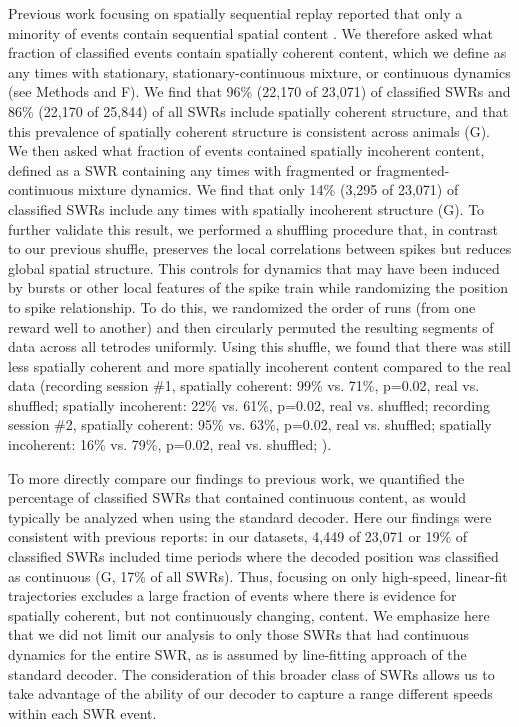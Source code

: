 \documentclass[9pt,lineno]{elife}
\begin{document}
Previous work focusing on spatially sequential replay reported that only a minority of events contain sequential spatial content \citep{KarlssonAwakereplayremote2009, FosterReversereplaybehavioural2006, DavidsonHippocampalReplayExtended2009}. We therefore asked what fraction of classified events contain spatially coherent content, which we define as any times with stationary, stationary-continuous mixture, or continuous dynamics (see Methods and F). We find that 96\% (22,170 of 23,071) of classified SWRs and 86\% (22,170 of 25,844) of all SWRs include spatially coherent structure, and that this prevalence of spatially coherent structure is consistent across animals (G). We then asked what fraction of events contained spatially incoherent content, defined as a SWR containing any times with fragmented or fragmented-continuous mixture dynamics. We find that only 14\% (3,295 of 23,071) of classified SWRs include any times with spatially incoherent structure (G). To further validate this result, we performed a shuffling procedure that, in contrast to our previous shuffle, preserves the local correlations between spikes but reduces global spatial structure. This controls for dynamics that may have been induced by bursts or other local features of the spike train while randomizing the position to spike relationship. To do this, we randomized the order of runs (from one reward well to another) and then circularly permuted the resulting segments of data across all tetrodes uniformly. Using this shuffle, we found that there was still less spatially coherent and more spatially incoherent content compared to the real data (recording session \#1, spatially coherent: 99\% vs. 71\%, p=0.02, real vs. shuffled; spatially incoherent: 22\% vs. 61\%, p=0.02, real vs. shuffled; recording session \#2, spatially coherent: 95\% vs. 63\%, p=0.02, real vs. shuffled; spatially incoherent: 16\% vs. 79\%, p=0.02, real vs. shuffled; ).

To more directly compare our findings to previous work, we quantified the percentage of classified SWRs that contained continuous content, as would typically be analyzed when using the standard decoder. Here our findings were consistent with previous reports: in our datasets, 4,449 of 23,071 or 19\% of classified SWRs included time periods where the decoded position was classified as continuous (G, 17\% of all SWRs). Thus, focusing on only high-speed, linear-fit trajectories excludes a large fraction of events where there is evidence for spatially coherent, but not continuously changing, content. We emphasize here that we did not limit our analysis to only those SWRs that had continuous dynamics for the entire SWR, as is assumed by line-fitting approach of the standard decoder. The consideration of this broader class of SWRs allows us to take advantage of the ability of our decoder to capture a range different speeds within each SWR event.
\end{document}
